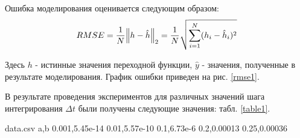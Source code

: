 	Ошибка моделирования оценивается следующим образом:
	\begin{equation}
		RMSE = \frac{1}{N} \norm{h - \hat{h}}_2 = \frac{1}{N}\sqrt{\sum_{i=1}^N (h_i - \hat{h}_i)^2}
	\end{equation}

	Здесь $h$ - истинные значения переходной функции, $\hat{y}$ - значения, полученные в результате моделирования. График ошибки приведен на рис. \ref{rmse1}.
	
	В результате проведения экспериментов для различных значений шага интегрирования $\Delta t$ были получены следующие значения: табл. \ref{table1}.
	
	\begin{filecontents*}{data.csv}
	a,b
	0.001,5.45e-14
	0.01,5.57e-10
	0.1,6.73e-6
	0.2,0.00013
	0.25,0.00036
	\end{filecontents*}

	\begin{center}
		\label{rmse1}	
	\end{center}
	
